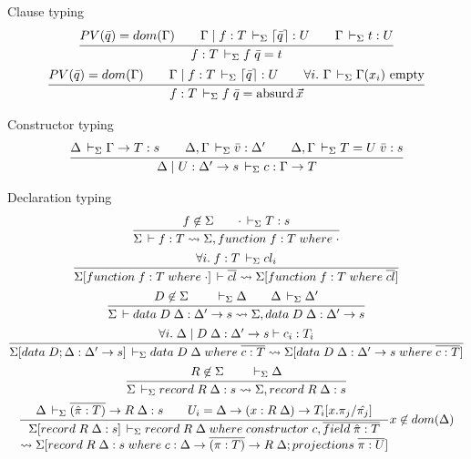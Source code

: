 \documentclass[acmlarge,fleqn]{acmart}\settopmatter{}
\begin{document}
Clause typing 
\begin{gather*}
\ru{PV(\bar{q}) = dom(\Gamma) \qquad
    \Gamma \mid f : T \ders \lceil \bar{q} \rceil : U \qquad
    \Gamma \ders t : U}
   {f : T \ders f\; \bar{q} = t}
\\
\ru{PV(\bar{q}) = dom(\Gamma) \qquad
    \Gamma \mid f : T \ders \lceil \bar{q} \rceil : U \qquad
    \forall i.\ \Gamma \ders \Gamma(x_i) \mempty}
   {f : T \ders f\; \bar{q} = \absurd \vec x}
\end{gather*}

Constructor typing 
\begin{gather*}
\ru{\Delta \ders \Gamma \to T : s \qquad
    \Delta,\Gamma \ders \bar{v} : \Delta' \qquad
    \Delta,\Gamma \ders T = U\; \bar{v} : s}
   {\Delta \mid U : \Delta' \to s \ders c : \Gamma \to T}
\end{gather*}

Declaration typing 
\begin{gather*}
\ru{f \not\in \Sigma \qquad \cdot \ders T : s}
   {\Sigma \der f : T \leadsto \Sigma, function\; f : T\; where\; \cdot}
\\
\ru{\forall i.\; f : T \ders cl_i}
   {\Sigma[function\; f : T\; where\; \cdot] \der \overline{cl} \leadsto \Sigma[function\; f : T\; where\; \overline{cl}]}
\\
\ru{D \not\in \Sigma \qquad \ders \Delta \qquad \Delta \ders \Delta'}
   {\Sigma \der data\; D\; \Delta : \Delta' \to s \leadsto \Sigma, data\; D\; \Delta : \Delta' \to s}
\\
\ru{\forall i.\; \Delta \mid D\; \Delta : \Delta' \to s \vdash c_i : T_i}
   {\Sigma[data\; D; \Delta : \Delta' \to s] \ders data\; D\; \Delta\; where\; \overline{c : T} \leadsto \Sigma[data\; D\; \Delta : \Delta' \to s\; where\; \overline{c : T}]}
\\
\ru{R \not\in \Sigma \qquad \ders \Delta}
   {\Sigma \ders record\; R \; \Delta : s \leadsto \Sigma, record\; R\; \Delta : s}
\\
\ru{\Delta \ders \overline{(\hat{\pi} : T)} \to R\; \Delta : s \qquad
    U_i = \Delta \to (x : R\; \Delta) \to T_i[x.\pi_j / \hat{\pi_j}] }
   {\Sigma[record\; R\; \Delta : s] \ders record\; R\; \Delta\; where\; constructor\; c, \overline{field\; \hat{\pi} : T} \\  \leadsto \Sigma[record\; R\; \Delta : s\; where\; c : \Delta \to \overline{(\pi : T)} \to R\; \Delta; projections\; \overline{\pi : U}]} x \not\in dom(\Delta)
\end{gather*}
\end{document}
